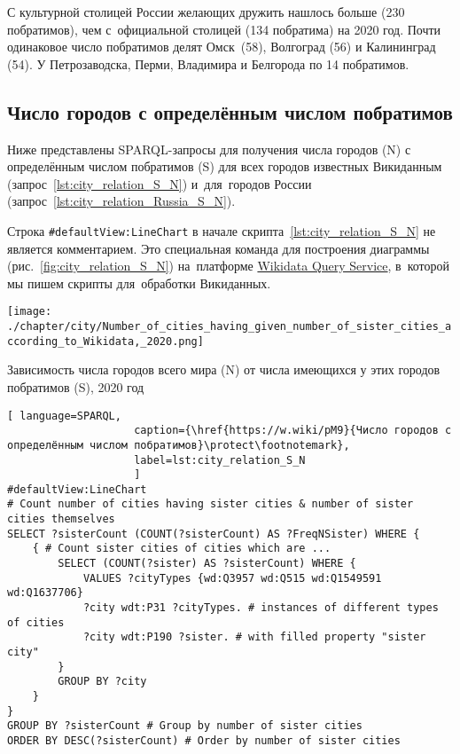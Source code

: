 С культурной столицей России желающих дружить нашлось больше (230 побратимов), 
чем с~официальной столицей (134 побратима) на 2020 год. 
Почти одинаковое число побратимов делят Омск~(58), Волгоград (56) и Калининград (54). 
У Петрозаводска, Перми, Владимира и Белгорода по 14 побратимов.




\subsection{Число городов с определённым числом побратимов}

Ниже представлены SPARQL-запросы для получения числа городов (N) 
с определённым числом побратимов (S) для всех городов известных Викиданным 
(запрос~\ref{lst:city_relation_S_N}) и~для~городов России (запрос~\ref{lst:city_relation_Russia_S_N}).

Строка \lstinline|#defaultView:LineChart| 
в начале скрипта~\ref{lst:city_relation_S_N} не является комментарием. 
Это специальная команда для построения диаграммы (рис.~\ref{fig:city_relation_S_N}) 
на~платформе \href{https://query.wikidata.org}{Wikidata Query Service}, 
в~которой мы пишем скрипты для~обработки Викиданных.

\begin{marginfigure}[22pt]
\texttt{[image: ./chapter/city/Number\_of\_cities\_having\_given\_number\_of\_sister\_cities\_according\_to\_Wikidata,\_2020.png]}%
\caption[Зависимость числа городов от числа имеющихся побратимов, 2020 год.]{Зависимость числа городов всего мира (N) от числа имеющихся у этих городов побратимов (S), 2020 год}%
\label{fig:city_relation_S_N}
\end{marginfigure}

\begin{lstlisting}[ language=SPARQL, 
                    caption={\href{https://w.wiki/pM9}{Число городов с определённым числом побратимов}\protect\footnotemark},
                    label=lst:city_relation_S_N
                    ]
#defaultView:LineChart
# Count number of cities having sister cities & number of sister cities themselves
SELECT ?sisterCount (COUNT(?sisterCount) AS ?FreqNSister) WHERE {                                                                         
	{ # Count sister cities of cities which are ...
		SELECT (COUNT(?sister) AS ?sisterCount) WHERE {        
			VALUES ?cityTypes {wd:Q3957 wd:Q515 wd:Q1549591 wd:Q1637706}
			?city wdt:P31 ?cityTypes. # instances of different types of cities
			?city wdt:P190 ?sister. # with filled property "sister city"
		}
		GROUP BY ?city
	}
}
GROUP BY ?sisterCount # Group by number of sister cities                                     
ORDER BY DESC(?sisterCount) # Order by number of sister cities   
\end{lstlisting}
\footnotetext[17][-52pt]{%
Получено: 90 вариантов числа братских городов в мире в 2020 году. Ссылка на~SPARQL-запрос: \href{https://w.wiki/pM9}{https://w.wiki/pM9}.}

